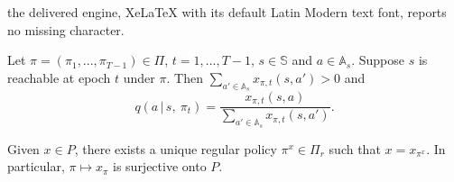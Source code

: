 \documentclass[10pt,a4paper]{amsart}
\begin{document}
the delivered engine, XeLaTeX with its default Latin Modern text font, reports no missing character.
\begin{lemma}
\label{lem2}
Let $\pi = (\pi_1, ..., \pi_{T-1}) \in \Pi$, $t = 1, ..., T-1$, $s \in \mathbb{S}$ and $a \in \mathbb{A}_s$.
Suppose $s$ is reachable at epoch $t$ under $\pi$. Then $\sum_{a' \in \mathbb{A}_s}x_{\pi, t}(s, a') > 0$ %
and
\begin{equation}
\label{q_formula}
q(a \,|\, s,\ \pi_t) = \frac{x_{\pi, t}(s, a)}{{\sum_{a' \in \mathbb{A}_s}x_{\pi, t}(s, a')}}.
\end{equation}
\end{lemma}

\begin{proposition}
\label{prop2}
%
Given $x \in  P$,  there exists a unique regular policy $\pi^x \in \Pi_r$ such that $x = x_{\pi^x}$. In particular, $\pi \mapsto x_\pi$ is surjective 
onto $P$.
\end{proposition}
\end{document}
